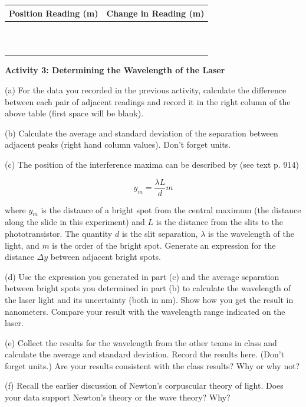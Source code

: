 \vspace{0.3cm}
{\centering \begin{tabular}{|c|c|}
\hline 
Position Reading (m)&
Change in Reading (m)\\
\hline
\hline 
&
\\
\hline 
&
\\
\hline 
&
\\
\hline 
&
\\
\hline 
&
\\
\hline 
&
\\
\hline 
&
\\
\hline
&
\\
\hline
&
\\
\hline
&
\\
\hline
&
\\
\hline
\end{tabular}\par}
\vspace{0.3cm}

\textbf{Activity 3: Determining the Wavelength of the Laser }

(a) For the data you recorded in the previous activity, calculate the 
difference between each pair of adjacent readings and record it in the 
right column of the above table (first space will be blank).

(b) Calculate the average and standard deviation of the separation between 
adjacent peaks (right hand column values). Don't forget units.
\vspace{15mm}

\newpage

(c) The position of the interference maxima can be described by (see text p. 
914)

\[
y_{m}=\frac{\lambda L}{d}m\]


where $y_{m}$ is the distance of a bright spot from the central
maximum (the distance along the slide in this experiment) and $L$ is
the distance from the slits to the phototransistor. The quantity $d$
is the slit separation, \( \lambda  \) is the wavelength of the light,
and $m$ is the order of the bright spot. Generate an expression for
the distance $\Delta y$ between adjacent bright spots.
\vspace{20mm}

(d) Use the expression you generated in part (c) and the average separation
between bright spots you determined in part (b) to calculate the wavelength of 
the laser light and its uncertainty (both in nm). Show how you get the result 
in nanometers. Compare your result with the wavelength range indicated on the 
laser.
\vspace{40mm}

(e) Collect the results for the wavelength from the other teams in class
and calculate the average and standard deviation. Record the results here. 
(Don't forget units.)
Are your results consistent with the class results? Why or why not?
\vspace{60mm}

(f) Recall the earlier discussion of Newton's corpuscular theory of
light. Does your data support Newton's theory or the wave theory?
Why?\vspace{15mm}

